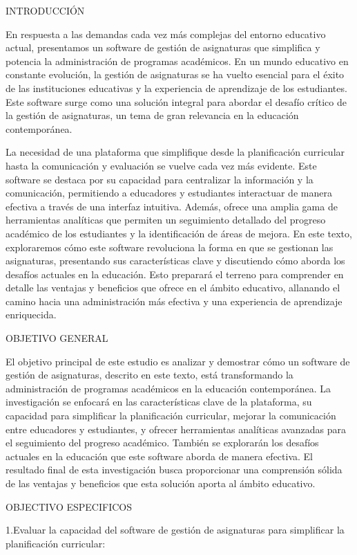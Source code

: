 INTRODUCCIÓN

En respuesta a las demandas cada vez más complejas del entorno educativo actual, presentamos un software de gestión de
asignaturas que simplifica y potencia la administración de programas académicos. En un mundo educativo en constante
evolución, la gestión de asignaturas se ha vuelto esencial para el éxito de las instituciones educativas y la experiencia
de aprendizaje de los estudiantes. Este software surge como una solución integral para abordar el desafío crítico de la 
gestión de asignaturas, un tema de gran relevancia en la educación contemporánea.

La necesidad de una plataforma que simplifique desde la planificación curricular hasta la comunicación y
evaluación se vuelve cada vez más evidente. Este software se destaca por su capacidad para centralizar la información
y la comunicación, permitiendo a educadores y estudiantes interactuar de manera efectiva a través de una interfaz
intuitiva. Además, ofrece una amplia gama de herramientas analíticas que permiten un seguimiento detallado del progreso
académico de los estudiantes y la identificación de áreas de mejora. En este texto, exploraremos cómo este
software revoluciona la forma en que se gestionan las asignaturas, presentando sus características clave y discutiendo
cómo aborda los desafíos actuales en la educación. Esto preparará el terreno para comprender en detalle las ventajas y
beneficios que ofrece en el ámbito educativo, allanando el camino hacia una administración más efectiva y una
experiencia de aprendizaje enriquecida.


OBJETIVO GENERAL


El objetivo principal de este estudio es analizar y demostrar cómo un software de gestión de asignaturas, descrito en este texto, está transformando la administración de programas académicos en la educación contemporánea. La investigación se enfocará en las características clave de la plataforma, su capacidad para simplificar la planificación curricular, mejorar la comunicación entre educadores y estudiantes, y ofrecer herramientas analíticas avanzadas para el seguimiento del progreso académico. También se explorarán los desafíos actuales en la educación que este software aborda de manera efectiva. El resultado final de esta investigación busca proporcionar una comprensión sólida de las ventajas y beneficios que esta solución aporta al ámbito educativo.

OBJECTIVO ESPECIFICOS 

1.Evaluar la capacidad del software de gestión de asignaturas para simplificar la planificación curricular:

